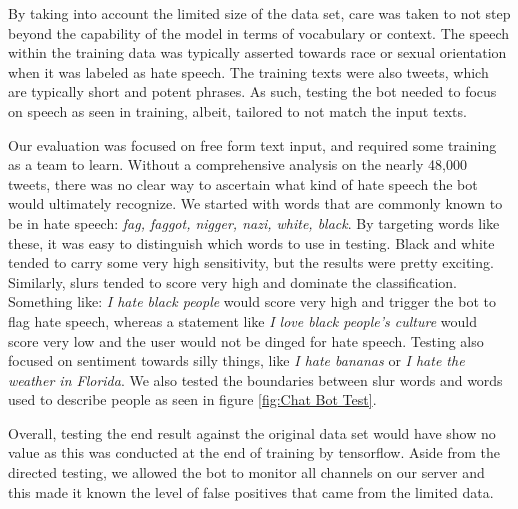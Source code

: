 \documentclass[conference]{sig-alternate-05-2015}
\begin{document}
By taking into account the limited size of the data set, care was taken to not step beyond the capability of the model in terms of vocabulary or context.  The speech within the training data was typically asserted towards race or sexual orientation when it was labeled as hate speech.  The training texts were also tweets, which are typically short and potent phrases.  As such, testing the bot needed to focus on speech as seen in training, albeit, tailored to not match the input texts.

Our evaluation was focused on free form text input, and required some training as a team to learn.  Without a comprehensive analysis on the nearly 48,000 tweets, there was no clear way to ascertain what kind of hate speech the bot would ultimately recognize.  We started with words that are commonly known to be in hate speech: \textit{fag, faggot, nigger, nazi, white, black}.  By targeting words like these, it was easy to distinguish which words to use in testing.  Black and white tended to carry some very high sensitivity, but the results were pretty exciting.  Similarly, slurs tended to score very high and dominate the classification.  Something like: \textit{I hate black people} would score very high and trigger the bot to flag hate speech, whereas a statement like \textit{I love black people's culture} would score very low and the user would not be dinged for hate speech.  Testing also focused on sentiment towards silly things, like \textit{I hate bananas} or \textit{I hate the weather in Florida}.    We also tested the boundaries between slur words and words used to describe people as seen in figure \ref{fig:Chat Bot Test}.

Overall, testing the end result against the original data set would have show no value as this was conducted at the end of training by tensorflow.  Aside from the directed testing, we allowed the bot to monitor all channels on our server and this made it known the level of false positives that came from the limited data.  
\end{document}
